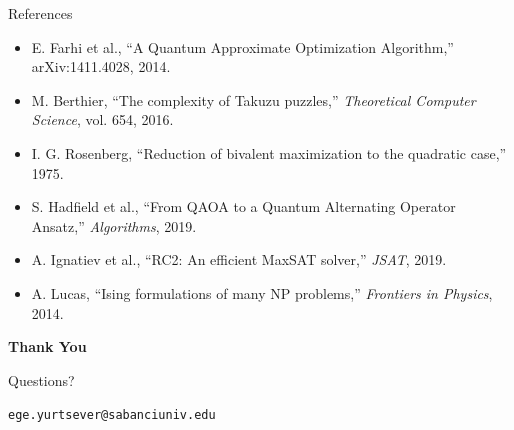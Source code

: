 \documentclass[aspectratio=169]{beamer}
\begin{document}
\begin{frame}{References}
\footnotesize
\begin{itemize}
    \item E. Farhi et al., ``A Quantum Approximate Optimization Algorithm,'' arXiv:1411.4028, 2014.
    \item M. Berthier, ``The complexity of Takuzu puzzles,'' \textit{Theoretical Computer Science}, vol. 654, 2016.
    \item I. G. Rosenberg, ``Reduction of bivalent maximization to the quadratic case,'' 1975.
    \item S. Hadfield et al., ``From QAOA to a Quantum Alternating Operator Ansatz,'' \textit{Algorithms}, 2019.
    \item A. Ignatiev et al., ``RC2: An efficient MaxSAT solver,'' \textit{JSAT}, 2019.
    \item A. Lucas, ``Ising formulations of many NP problems,'' \textit{Frontiers in Physics}, 2014.
\end{itemize}
\end{frame}

\begin{frame}{}
\centering
\vfill
{\Large \textbf{Thank You}}

\bigskip
{\large Questions?}

\bigskip
\texttt{ege.yurtsever@sabanciuniv.edu}
\vfill
\end{frame}
\end{document}
